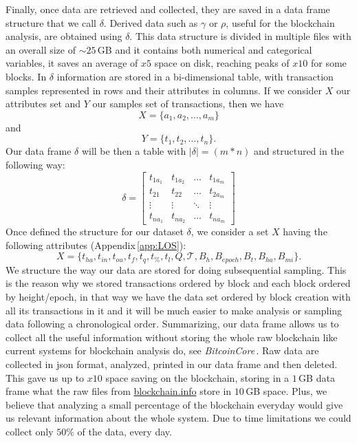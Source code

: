 \documentclass[USenglish]{uit-thesis}
\begin{document}
Finally, once data are
retrieved and collected, they are saved in a data frame
structure that we call $\delta$.
Derived data such as $\gamma$ or $\rho$,
useful for the blockchain analysis, are obtained using $\delta$.
This data structure is divided in multiple files
with an overall size of $\sim$$25$\,GB and it contains
both numerical and categorical variables, it saves an average
of $x5$ space on disk, reaching peaks of $x10$ for some blocks.
In $\delta$ information are stored in a bi-dimensional table,
with transaction samples represented in
rows and their attributes in columns.
If we consider $X$ our attributes set and $Y$ our samples set
of transactions, then we have
\[
X = \{ a_1, a_2, \dots, a_m \}
\]
and
\[
Y = \{ t_1, t_2, \dots, t_n \}.
\]
Our data frame $\delta$ will be then a table with $|\delta| = (m * n)$
and structured in the following way:
\begin{equation}
\label{eq:dataframe}
\delta = \begin{bmatrix}
t_{1a_1} & t_{1a_2}  & \dots & t_{1a_m}\\
t_{21} & t_{22} & \dots & t_{2a_m}\\
\vdots & \vdots & \ddots& \vdots\\
t_{na_1} & t_{na_2} & \dots & t_{na_m}
\end{bmatrix}
\end{equation}
Once defined the structure for our dataset $\delta$,
we consider a set $X$ having the following
attributes (Appendix\,\ref{app:LOS}):
\[
X = \{ t_{ha}, t_{in}, t_{ou}, t_f, t_q, t_\%, t_l, Q, \mathcal{T}, B_h, B_{epoch}, B_t, B_{ha}, B_{mi} \}.
\]
We structure the way our data are stored for doing
subsequential sampling.
This is the reason why we stored transactions
ordered by block and each block ordered by height/epoch,
in that way we have the data set ordered by block creation
with all its transactions in it and it will be much easier to make
analysis or sampling data following a chronological order.
Summarizing, our data frame allows us to collect all
the useful information without storing the whole raw
blockchain like current systems for blockchain analysis do,
see \emph{BitcoinCore}\,\cite{bitcoincore}. Raw data are
collected in \gls{json} format, analyzed, printed in our data frame
and then deleted. This gave us up to $x10$ space saving on the
blockchain, storing in a $1$\,GB data frame what the raw files
from \url{blockchain.info} store in $10$\,GB space. Plus, we
believe that analyzing a small percentage of the blockchain
everyday would give us relevant information about the
whole system. Due to time limitations we could collect only $50$\%
of the data, every day.
\end{document}
